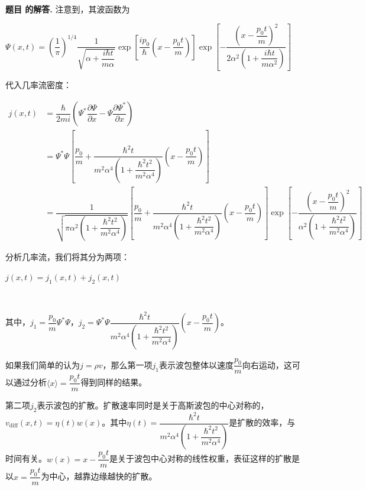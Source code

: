 \documentclass[12pt, a4paper, oneside]{ctexart}
\newcounter{problemname}
\newenvironment{solution}
  {\par\noindent\textbf{题目 \theproblemname 的解答. }}
  {\par}
\begin{document}
\begin{solution}
    注意到，其波函数为

    \centerline{$\Psi(x,t) = \left(\dfrac{1}{\pi}\right)^{1/4} \dfrac{1}{\sqrt{\alpha+\dfrac{i\hbar t}{m\alpha }}} \exp\left[\dfrac{ip_0}{\hbar}\left(x-\dfrac{p_0t}{m}\right)\right]\exp\left[-\dfrac{\left(x-\dfrac{p_0 t}{m}\right)^2}{2\alpha^2\left(1+\dfrac{i\hbar t}{m\alpha^2}\right)}\right]$}

    代入几率流密度：

    \begin{align*}
        j(x,t) &= \dfrac{\hbar}{2mi} \left( \Psi^* \dfrac{\partial \Psi}{\partial x} - \Psi \dfrac{\partial \Psi^*}{\partial x} \right)\\
        &= \Psi^* \Psi \left[\dfrac{p_0}{m}  + \dfrac{\hbar^2 t}{m^2 \alpha^4  \left(1 + \dfrac{\hbar^2 t^2}{m^2 \alpha^4}\right)} \left(x - \dfrac{p_0t}{m}\right)\right]\\
        &= \dfrac{1}{\sqrt{\pi \alpha^2 \left(1+\dfrac{ \hbar^2t^2}{m^2\alpha^4}\right)}} \left[\dfrac{p_0}{m}  + \dfrac{\hbar^2 t}{m^2 \alpha^4  \left(1 + \dfrac{\hbar^2 t^2}{m^2 \alpha^4}\right)} \left(x - \dfrac{p_0t}{m}\right)\right] \exp\left[  -\dfrac{\left(x - \dfrac{p_0t}{m}\right)^2}{\alpha^2 \left( 1+\dfrac{\hbar^2  t^2}{m^2\alpha^4}\right)}\right]
    \end{align*}

    分析几率流，我们将其分为两项：

    \centerline{$j(x,t) = j_1(x,t) + j_2(x,t)$}

    \centerline{$\,$}

    其中，$j_1 = \dfrac{p_0}{m} \Psi^* \Psi$，$j_2 = \Psi^* \Psi \dfrac{\hbar^2 t}{m^2 \alpha^4  \left(1 + \dfrac{\hbar^2 t^2}{m^2 \alpha^4}\right)} \left(x - \dfrac{p_0t}{m}\right)$。

    如果我们简单的认为$j = \rho v$，那么第一项$j_1$表示波包整体以速度$\dfrac{p_0}{m}$向右运动，这可以通过分析$\langle x \rangle = \dfrac{p_0 t}{m}$得到同样的结果。

    第二项$j_2$表示波包的扩散。扩散速率同时是关于高斯波包的中心对称的，$v_{\mathrm{diff}}(x,t) = \eta(t) w(x)$。其中$\eta(t) = \dfrac{\hbar^2 t}{m^2 \alpha^4  \left(1 + \dfrac{\hbar^2 t^2}{m^2 \alpha^4}\right)}$是扩散的效率，与时间有关。$w(x) = x - \dfrac{p_0t}{m}$是关于波包中心对称的线性权重，表征这样的扩散是以$x = \dfrac{p_0t}{m}$为中心，越靠边缘越快的扩散。


\end{solution}
\end{document}
